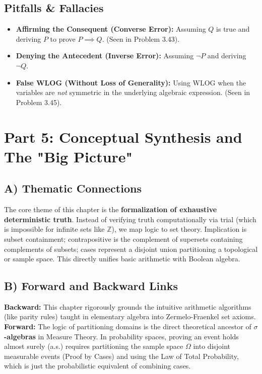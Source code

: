 \documentclass[11pt, letterpaper]{article}
\theoremstyle{definition}
\theoremstyle{remark}
\newcommand{\Z}{\mathbb{Z}}
\begin{document}
\subsection{Pitfalls \& Fallacies}
\begin{itemize}
    \item \textbf{Affirming the Consequent (Converse Error):} Assuming $Q$ is true and deriving $P$ to prove $P \implies Q$. (Seen in Problem 3.43).
    \item \textbf{Denying the Antecedent (Inverse Error):} Assuming $\neg P$ and deriving $\neg Q$. 
    \item \textbf{False WLOG (Without Loss of Generality):} Using WLOG when the variables are \textit{not} symmetric in the underlying algebraic expression. (Seen in Problem 3.45).
\end{itemize}

\newpage

\section{Part 5: Conceptual Synthesis and The "Big Picture"}

\subsection{A) Thematic Connections}
The core theme of this chapter is the \textbf{formalization of exhaustive deterministic truth}. Instead of verifying truth computationally via trial (which is impossible for infinite sets like $\Z$), we map logic to set theory. Implication is subset containment; contrapositive is the complement of supersets containing complements of subsets; cases represent a disjoint union partitioning a topological or sample space. This directly unifies basic arithmetic with Boolean algebra.

\subsection{B) Forward and Backward Links}
\textbf{Backward:} This chapter rigorously grounds the intuitive arithmetic algorithms (like parity rules) taught in elementary algebra into Zermelo-Fraenkel set axioms. \\
\textbf{Forward:} The logic of partitioning domains is the direct theoretical ancestor of \textbf{$\sigma$-algebras} in Measure Theory. In probability spaces, proving an event holds almost surely (a.s.) requires partitioning the sample space $\Omega$ into disjoint measurable events (Proof by Cases) and using the Law of Total Probability, which is just the probabilistic equivalent of combining cases.
\end{document}
